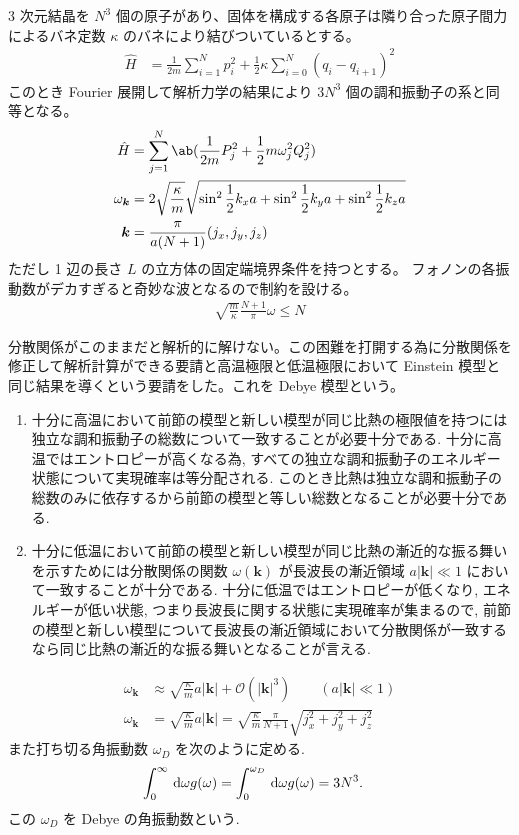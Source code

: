 \documentclass[uplatex,diffipdfmx,a4paper,11pt]{jlreq}
\newcommand{\kk}{\bm{k}}
\numberwithin{equation}{section}
\theoremstyle{definition}
\begin{document}
3 次元結晶を $N^3$ 個の原子があり、固体を構成する各原子は隣り合った原子間力によるバネ定数 $\kappa$ のバネにより結びついているとする。
\begin{align}
  \hat{H} & = \frac{1}{2m}\sum_{i=1}^{N}p_i^2 + \frac{1}{2}\kappa\sum_{i=0}^{N}(q_i - q_{i+1})^2
\end{align}
このとき Fourier 展開して解析力学の結果により $3N^3$ 個の調和振動子の系と同等となる。
\begin{align}
  \hat{H}      & = \sum_{j=1}^{N}\ab(\frac{1}{2m}P_j^2 + \frac{1}{2}m\omega_j^2Q_j^2)                                   \\
  \omega_{\kk} & = 2\sqrt{\frac{\kappa}{m}}\sqrt{\sin^2\frac{1}{2}k_xa + \sin^2\frac{1}{2}k_ya + \sin^2\frac{1}{2}k_za} \\
  \kk          & = \frac{\pi}{a(N+1)}(j_x, j_y, j_z)
\end{align}
ただし 1 辺の長さ $L$ の立方体の固定端境界条件を持つとする。
フォノンの各振動数がデカすぎると奇妙な波となるので制約を設ける。
\begin{align}
  \sqrt{\frac{m}{\kappa}}\frac{N+1}{\pi}\omega \leq N
\end{align}

分散関係がこのままだと解析的に解けない。この困難を打開する為に分散関係を修正して解析計算ができる要請と高温極限と低温極限において Einstein 模型と同じ結果を導くという要請をした。これを Debye 模型という。
\begin{enumerate}
  \item 十分に高温において前節の模型と新しい模型が同じ比熱の極限値を持つには独立な調和振動子の総数について一致することが必要十分である.
        十分に高温ではエントロピーが高くなる為, すべての独立な調和振動子のエネルギー状態について実現確率は等分配される. このとき比熱は独立な調和振動子の総数のみに依存するから前節の模型と等しい総数となることが必要十分である.
  \item 十分に低温において前節の模型と新しい模型が同じ比熱の漸近的な振る舞いを示すためには分散関係の関数 $\omega(\bm{k})$ が長波長の漸近領域 $a|\bm{k}| \ll 1$ において一致することが十分である.
        十分に低温ではエントロピーが低くなり, エネルギーが低い状態, つまり長波長に関する状態に実現確率が集まるので, 前節の模型と新しい模型について長波長の漸近領域において分散関係が一致するなら同じ比熱の漸近的な振る舞いとなることが言える.
\end{enumerate}
\begin{align}
  \omega_{\kk} & \approx \sqrt{\frac{\kappa}{m}}a|\bm{k}| + \mathcal{O}(|\bm{k}|^3) \qquad (a|\bm{k}| \ll 1)               \\
  \omega_{\kk} & = \sqrt{\frac{\kappa}{m}}a|\bm{k}| = \sqrt{\frac{\kappa}{m}}\frac{\pi}{N + 1}\sqrt{j_x^2 + j_y^2 + j_z^2}
\end{align}
また打ち切る角振動数 $\omega_D$ を次のように定める.
\begin{align}
  \int_0^\infty\dl{\omega}g(\omega) & = \int_0^{\omega_D}\dl{\omega}g(\omega) = 3N^3.
\end{align}
この $\omega_D$ を Debye の角振動数という.
\end{document}
